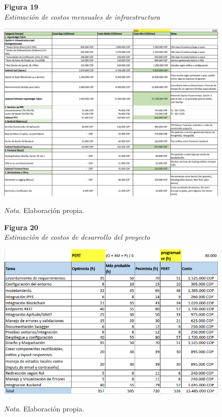 \documentclass[
    letterpaper, 
    man,   
    spanish,
    12pt,
    donotrepeattitle,
    floatsintext,
    hidelinks %
]{apa7}
\begin{document}
\begin{figure}[htbp]
    \begin{flushleft}
        \textbf{Figura 19}\\
        \textit{Estimación de costos mensuales de infraestructura}
    \end{flushleft}
    \centering
    \includegraphics[width=\textwidth]{Images/costos2.png}
    \vspace{0.5em}
    \begin{flushleft}
        \textit{Nota.} Elaboración propia.
    \end{flushleft}
    \label{fig:costos2}
\end{figure}

\begin{figure}[htbp]
    \begin{flushleft}
        \textbf{Figura 20}\\
        \textit{Estimación de costos de desarrollo del proyecto}
    \end{flushleft}
    \centering
    \includegraphics[width=\textwidth]{Images/costos3.png}
    \vspace{0.5em}
    \begin{flushleft}
        \textit{Nota.} Elaboración propia.
    \end{flushleft}
    \label{fig:costos3}
\end{figure}
\end{document}
